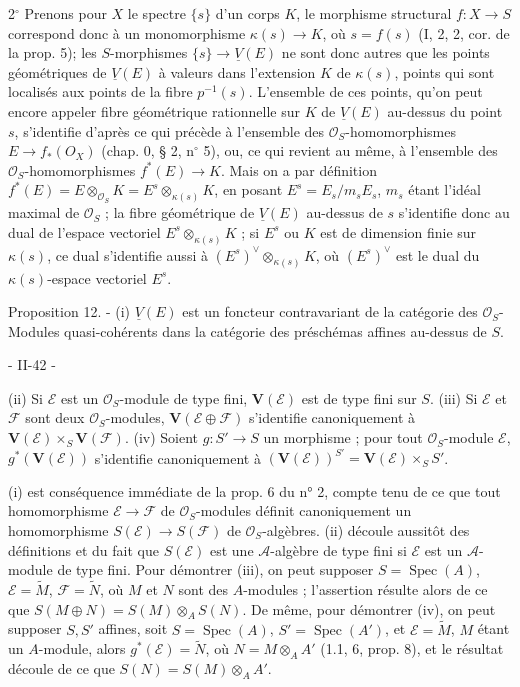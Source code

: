 2$^\circ$ Prenons pour $X$ le spectre $\{s\}$ d'un corps $K$, le morphisme structural $f : X \to S$ correspond donc à un monomorphisme $\kappa(s) \to K$, où $s = f(s)$ (I, 2, 2, cor. de la prop. 5); les $S$-morphismes $\{s\} \to \underline{V}(E)$ ne sont donc autres que les points géométriques de $\underline{V}(E)$ à valeurs dans l'extension $K$ de $\kappa(s)$, points qui sont localisés aux points de la fibre $p^{-1}(s)$. L'ensemble de ces points, qu'on peut encore appeler fibre géométrique rationnelle sur $K$ de $\underline{V}(E)$ au-dessus du point $s$, s'identifie d'après ce qui précède à l'ensemble des $\mathcal{O}_S$-homomorphismes $E \to f_*(O_X)$ (chap. 0, § 2, n$^\circ$ 5), ou, ce qui revient au même, à l'ensemble des $\mathcal{O}_S$-homomorphismes $f^*(E) \to K$. Mais on a par définition $f^*(E) = E \otimes_{\mathcal{O}_S} K = E^s \otimes_{\kappa(s)} K$, en posant $E^s = E_s / m_s E_s$, $m_s$ étant l'idéal maximal de $\mathcal{O}_S$ ; la fibre géométrique de $\underline{V}(E)$ au-dessus de $s$ s'identifie donc au dual de l'espace vectoriel $E^s \otimes_{\kappa(s)} K$ ; si $E^s$ ou $K$ est de dimension finie sur $\kappa(s)$, ce dual s'identifie aussi à $(E^s)^\vee \otimes_{\kappa(s)} K$, où $(E^s)^\vee$ est le dual du $\kappa(s)$-espace vectoriel $E^s$.

Proposition 12. - (i) $\underline{V}(E)$ est un foncteur contravariant de la catégorie des $\mathcal{O}_S$-Modules quasi-cohérents dans la catégorie des préschémas affines au-dessus de $S$.

\newpage


- II-42 -

(ii) Si $\mathcal{E}$ est un $\mathcal{O}_S$-module de type fini, $\mathbf{V}(\mathcal{E})$ est de type fini sur $S$.
(iii) Si $\mathcal{E}$ et $\mathcal{F}$ sont deux $\mathcal{O}_S$-modules, $\mathbf{V}(\mathcal{E} \oplus \mathcal{F})$ s'identifie canoniquement à $\mathbf{V}(\mathcal{E}) \times_S \mathbf{V}(\mathcal{F})$.
(iv) Soient $g: S' \to S$ un morphisme ; pour tout $\mathcal{O}_S$-module $\mathcal{E}$, $g^*(\mathbf{V}(\mathcal{E}))$ s'identifie canoniquement à $(\mathbf{V}(\mathcal{E}))^{S'} = \mathbf{V}(\mathcal{E}) \times_S S'$.

(i) est conséquence immédiate de la prop. 6 du n° 2, compte tenu de ce que tout homomorphisme $\mathcal{E} \to \mathcal{F}$ de $\mathcal{O}_S$-modules définit canoniquement un homomorphisme $S(\mathcal{E}) \to S(\mathcal{F})$ de $\mathcal{O}_S$-algèbres. (ii) découle aussitôt des définitions et du fait que $S(\mathcal{E})$ est une $\mathcal{A}$-algèbre de type fini si $\mathcal{E}$ est un $\mathcal{A}$-module de type fini. Pour démontrer (iii), on peut supposer $S = \operatorname{Spec}(A)$, $\mathcal{E} = \widetilde{M}$, $\mathcal{F} = \widetilde{N}$, où $M$ et $N$ sont des $A$-modules ; l'assertion résulte alors de ce que $S(M \oplus N) = S(M) \otimes_A S(N)$. De même, pour démontrer (iv), on peut supposer $S, S'$ affines, soit $S = \operatorname{Spec}(A)$, $S' = \operatorname{Spec}(A')$, et $\mathcal{E} = \widetilde{M}$, $M$ étant un $A$-module, alors $g^*(\mathcal{E}) = \widetilde{N}$, où $N = M \otimes_A A'$ (1.1, 6, prop. 8), et le résultat découle de ce que $S(N) = S(M) \otimes_A A'$.


